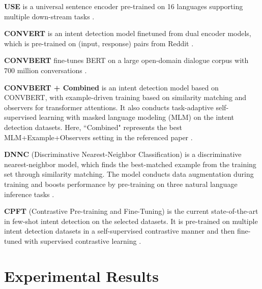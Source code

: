 \documentclass[11pt]{article}
\begin{document}
\noindent \textbf{USE} is a universal sentence encoder pre-trained on 16 languages supporting multiple down-stream tasks \cite{yang-etal-2020-multilingual}. 

\noindent \textbf{C{\small ONVE}RT} is an intent detection model finetuned from dual encoder models, which is pre-trained on (input, response) pairs from Reddit \cite{henderson-etal-2020-convert}.

\noindent \textbf{C{\small ONV}BERT} fine-tunes BERT on a large open-domain dialogue corpus with 700 million conversations \cite{DBLP:journals/corr/abs-2009-13570} .

\noindent \textbf{C{\small ONV}BERT + Combined} is an intent detection model based on C{\small ONV}BERT, with example-driven training based on similarity matching and observers for transformer attentions. It also conducts task-adaptive self-supervised learning with masked language modeling (MLM) on the intent detection datasets. Here, ``Combined" represents the best MLM+Example+Observers setting in the referenced paper \cite{mehri-eric-2021-example}.

\noindent \textbf{DNNC} (Discriminative Nearest-Neighbor Classification) is a discriminative nearest-neighbor model, which finds the best-matched example from the training set through similarity matching. The model conducts data augmentation during training and boosts performance by pre-training on three natural language inference tasks \cite{zhang-etal-2020-discriminative}.

\noindent \textbf{CPFT} (Contrastive Pre-training and Fine-Tuning) is the current state-of-the-art in few-shot intent detection on the selected datasets. It is pre-trained on multiple intent detection datasets in a self-supervised contrastive manner and then fine-tuned with supervised contrastive learning \cite{zhang-etal-2021-shot}.

\section{Experimental Results}
\label{sec:results}
\end{document}
